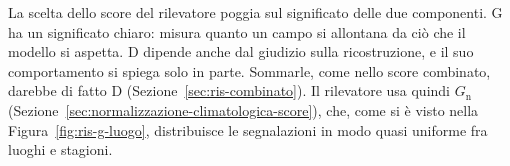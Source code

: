 
La scelta dello score del rilevatore poggia sul significato delle due componenti. G ha un significato chiaro: misura quanto un campo si allontana da ciò che il modello si aspetta. D dipende anche dal giudizio sulla ricostruzione, e il suo comportamento si spiega solo in parte. Sommarle, come nello score combinato, darebbe di fatto D (Sezione~\ref{sec:ris-combinato}). Il rilevatore usa quindi $G_{\mathrm{n}}$ (Sezione~\ref{sec:normalizzazione-climatologica-score}), che, come si è visto nella Figura~\ref{fig:ris-g-luogo}, distribuisce le segnalazioni in modo quasi uniforme fra luoghi e stagioni.

